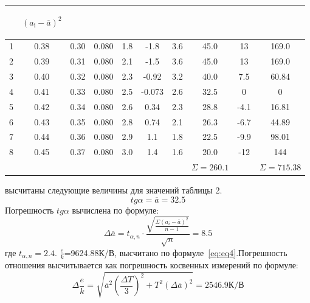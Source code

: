 \begin{center}
\begin{table}[H]
\begin{tabular}{|c|c|c|c|c|c|c|c|c|c|}
\begin{minipage}{21mm}
\end{minipage}&
\begin{minipage}{21mm}
     \begin{center} $(a_{\text{i}}-\overline{a})^2$ \end{center}
\end{minipage}\\
\hline
1 &  0.38  &  0.30  & 0.080 & 1.8& -1.8&3.6 & 45.0 &13 & 169.0\\
2 &  0.39  &  0.31  &  0.080 & 2.1& -1.5&3.6 &45.0 &13 &169.0\\
3 &  0.40  &  0.32  & 0.080  & 2.3& -0.92&3.2 &40.0 &7.5 &60.84\\
4 & 0.41  &  0.33 &  0.080 & 2.5& -0.073&2.6  &32.5 &0 & 0\\
5 & 0.42  &  0.34  &  0.080 &  2.6&0.34 &2.3 &28.8 &-4.1 & 16.81 \\
6 & 0.43  &  0.35  &  0.080 & 2.8&0.74 &2.1 &26.3 &-6.7 & 44.89\\
7 & 0.44  &  0.36  &  0.080 & 2.9&1.1 &1.8 &22.5 &-9.9 & 98.01 \\
8 & 0.45  &  0.37  &  0.080 & 3.0& 1.4 &1.6 &20.0 &-12 & 144 \\
 &   &    &   & &  & & $\Sigma=260.1$& & $\Sigma=715.38$ \\
\hline
\end{tabular}
\end{table}
\end{center}
 высчитаны следующие величины для значений таблицы 2.
\begin{equation}
    tg{\alpha}=\overline{a}=32.5
\end{equation}
Погрешность $tg{\alpha}$ вычислена по формуле:
\begin{equation}
    \Delta\overline{a}=t_{\alpha,n}\cdot\frac{\sqrt{\frac{\Sigma(a_i-\overline{a})^2}{{n-1}}}}{\sqrt{n}}=8.5
\end{equation}
где $t_{\alpha,n}=2.4$.
 $\frac{e}{k}$=9624.88К/В, высчитано по формуле~\ref{eq:eq4}.Погрешность отношения высчитывается как погрешность косвенных измерений по формуле:
\begin{equation}
    \Delta\frac{e}{k}=\sqrt{\overline{a}^2(\frac{\Delta T}{3})^2+T^2(\Delta\overline{a})^2}=2546.9 \text{К/В}
\end{equation}
